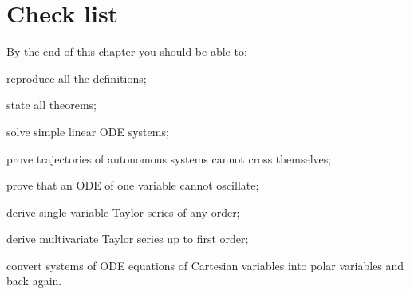 \section{Check list}
By the end of this chapter you should be able to:
\begin{todolist}
\item reproduce all the definitions;
\item state all theorems;
\item solve simple linear ODE systems;
\item prove trajectories of autonomous systems cannot cross themselves;
\item prove that an ODE of one variable cannot oscillate;
\item derive single variable Taylor series of any order;
\item derive multivariate Taylor series up to first order;
\item convert systems of ODE equations of Cartesian variables into polar variables and back again.
\end{todolist}






